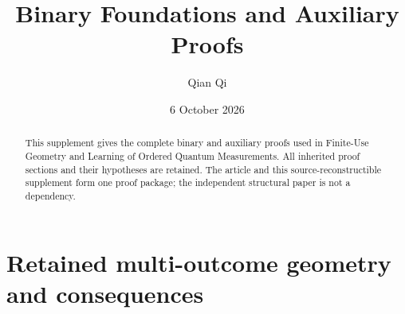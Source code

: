 \documentclass[11pt]{amsart}
\title[Binary foundations and auxiliary proofs]{Binary Foundations and Auxiliary Proofs}
\author{Qian Qi}
\date{6 October 2026}
\numberwithin{equation}{section}
\theoremstyle{definition}\newtheorem{definition}[theorem]{Definition}
\theoremstyle{remark}\newtheorem{remark}[theorem]{Remark}
\begin{document}
\raggedbottom
\begin{abstract}
This supplement gives the complete binary and auxiliary proofs used in
Finite-Use Geometry and Learning of Ordered Quantum Measurements.
All inherited proof sections and their hypotheses are retained.
The article and this source-reconstructible supplement form one proof
package; the independent structural paper is not a dependency.
\end{abstract}
\maketitle




















\section{Retained multi-outcome geometry and consequences}





\end{document}
